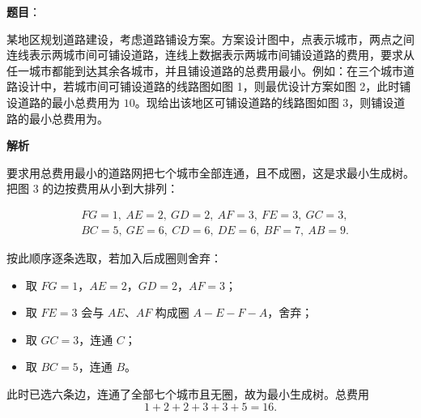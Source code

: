 \begin{answer}

\textbf{题目}：

某地区规划道路建设，考虑道路铺设方案。方案设计图中，点表示城市，两点之间连线表示两城市间可铺设道路，连线上数据表示两城市间铺设道路的费用，要求从任一城市都能到达其余各城市，并且铺设道路的总费用最小。例如：在三个城市道路设计中，若城市间可铺设道路的线路图如图 1，则最优设计方案如图 2，此时铺设道路的最小总费用为 $10$。现给出该地区可铺设道路的线路图如图 3，则铺设道路的最小总费用为\gkblank{}。
\nopagebreak[4]
\begin{center}\end{center}
\nopagebreak[4]
\nopagebreak[4]
\begin{center}\end{center}
\nopagebreak[4]
\nopagebreak[4]
\begin{center}\end{center}
\nopagebreak[4]
\textbf{解析}

要求用总费用最小的道路网把七个城市全部连通，且不成圈，这是求最小生成树。把图 3 的边按费用从小到大排列：

\nopagebreak[4]
\[\begin{aligned}
&FG=1,\ AE=2,\ GD=2,\ AF=3,\ FE=3,\ GC=3,\\
&BC=5,\ GE=6,\ CD=6,\ DE=6,\ BF=7,\ AB=9.
\end{aligned}\]

按此顺序逐条选取，若加入后成圈则舍弃：

\begin{itemize}
\item 取 $FG=1$，$AE=2$，$GD=2$，$AF=3$；
\item 取 $FE=3$ 会与 $AE$、$AF$ 构成圈 $A-E-F-A$，舍弃；
\item 取 $GC=3$，连通 $C$；
\item 取 $BC=5$，连通 $B$。
\end{itemize}

此时已选六条边，连通了全部七个城市且无圈，故为最小生成树。总费用
\nopagebreak[4]
\[1+2+2+3+3+5=16.\]


\end{answer}
